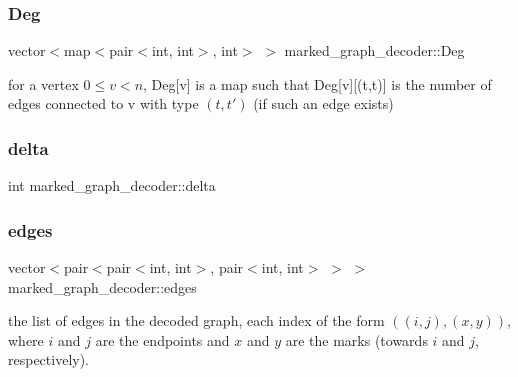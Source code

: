 \subsubsection{\texorpdfstring{Deg}{Deg}}
{\footnotesize\ttfamily vector$<$map$<$pair$<$int, int$>$, int$>$ $>$ marked\+\_\+graph\+\_\+decoder\+::\+Deg\hspace{0.3cm}{\ttfamily [private]}}



for a vertex $0 \leq v < n$, Deg\mbox{[}v\mbox{]} is a map such that Deg\mbox{[}v\mbox{]}\mbox{[}(t,t\textquotesingle{})\mbox{]} is the number of edges connected to v with type $(t,t')$ (if such an edge exists) 

\mbox{\label{classmarked__graph__decoder_a779d91c4c405b82baf0a3374401be0a2}} 
\subsubsection{\texorpdfstring{delta}{delta}}
{\footnotesize\ttfamily int marked\+\_\+graph\+\_\+decoder\+::delta\hspace{0.3cm}{\ttfamily [private]}}

\mbox{\label{classmarked__graph__decoder_af9e75da0a495d9c3bdcd169e15e3261e}} 
\subsubsection{\texorpdfstring{edges}{edges}}
{\footnotesize\ttfamily vector$<$pair$<$pair$<$int, int$>$, pair$<$int, int$>$ $>$ $>$ marked\+\_\+graph\+\_\+decoder\+::edges\hspace{0.3cm}{\ttfamily [private]}}



the list of edges in the decoded graph, each index of the form $((i,j), (x,y))$, where $i$ and $j$ are the endpoints and $x$ and $y$ are the marks (towards $i$ and $j$, respectively). 

\mbox{\label{classmarked__graph__decoder_a15bb3109398ce7c1f0ffbfae512e34c9}} 
